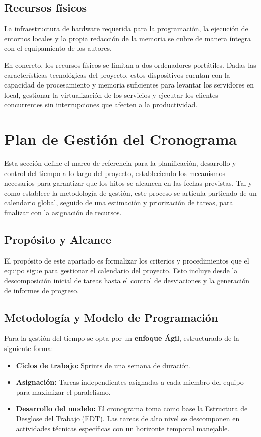 \subsection{Recursos físicos}

La infraestructura de hardware requerida para la programación, la ejecución de entornos locales y la propia redacción de la memoria se cubre de manera íntegra con el equipamiento de los autores.

En concreto, los recursos físicos se limitan a dos ordenadores portátiles. Dadas las características tecnológicas del proyecto, estos dispositivos cuentan con la capacidad de procesamiento y memoria suficientes para levantar los servidores en local, gestionar la virtualización de los servicios y ejecutar los clientes concurrentes sin interrupciones que afecten a la productividad.

\section{Plan de Gestión del Cronograma}

Esta sección define el marco de referencia para la planificación, desarrollo y control del tiempo a lo largo del proyecto, estableciendo los mecanismos necesarios para garantizar que los hitos se alcancen en las fechas previstas. Tal y como establece la metodología de gestión, este proceso se articula partiendo de un calendario global, seguido de una estimación y priorización de tareas, para finalizar con la asignación de recursos.

\subsection{Propósito y Alcance}
El propósito de este apartado es formalizar los criterios y procedimientos que el equipo sigue para gestionar el calendario del proyecto. Esto incluye desde la descomposición inicial de tareas hasta el control de desviaciones y la generación de informes de progreso.

\subsection{Metodología y Modelo de Programación}
Para la gestión del tiempo se opta por un \textbf{enfoque Ágil}, estructurado de la siguiente forma:
\begin{itemize}
    \item \textbf{Ciclos de trabajo:} Sprints de una semana de duración.
    \item \textbf{Asignación:} Tareas independientes asignadas a cada miembro del equipo para maximizar el paralelismo.
    \item \textbf{Desarrollo del modelo:} El cronograma toma como base la Estructura de Desglose del Trabajo (EDT). Las tareas de alto nivel se descomponen en actividades técnicas específicas con un horizonte temporal manejable.
\end{itemize}

